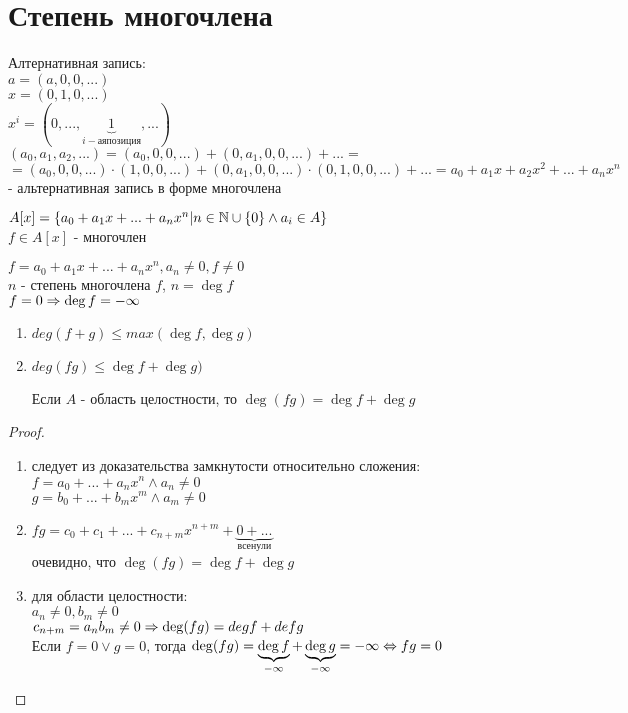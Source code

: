 \section{Степень многочлена}	
	Алтернативная запись:\\
		$ a = (a, 0, 0, ...)$\\		
		$ x = (0, 1, 0, ...)$\\		
		$ x^i = (0, ..., \underbrace{1}_{i-ая позиция}, ...)$\\
		$ (a_0, a_1, a_2, ...) = (a_0, 0, 0, ...) + (0, a_1, 0, 0, ...) + ... = $\\
		$= (a_0, 0, 0, ...) \cdot (1, 0, 0, ...) + (0, a_1, 0, 0, ...) \cdot (0, 1, 0, 0, ...) + ... = a_0 + a_1x + a_2x^2 + ... + a_nx^n$ - альтернативная запись в форме многочлена\\
	
\begin{Def}
	$ A[x] = \lbrace a_0 + a_1x + ... + a_nx^n | n \in \mathbb{N} \cup \lbrace 0 \rbrace \wedge a_i \in A \rbrace$\\
	$ f \in A[x]$ - многочлен
\end{Def}
	
\begin{Def}
	$ f = a_0 + a_1x + ... + a_nx^n, a_n \neq 0, f \neq 0$	\\
	$n$ - степень многочлена $f$, $n = \deg f$\\
	$f = 0 \Rightarrow \deg f = - \infty$
\end{Def}
	 
\begin{theorem}{}
	\begin{enumerate}
	\item $deg(f + g) \leq max(\deg f, \deg g)$
	\item $deg(fg)  \leq \deg f + \deg g)$
	\begin{Rem}
		Если $A$ - область целостности, то $\deg (fg) = \deg f + \deg g$
	\end{Rem}
	\end{enumerate}		
\end{theorem}			 

\begin{proof}
	\begin{enumerate}
	\item следует из доказательства замкнутости относительно сложения:\\
	$f = a_0 + ... + a_nx^n \wedge a_n \neq 0$\\
	$g = b_0 + ... + b_mx^m \wedge a_m \neq 0$
	\item $fg = c_0 + c_1 + ... + c_{n+m}x^{n+m} + \underbrace{0 + ... }_{все нули}$\\
	очевидно, что $\deg (fg) = \deg f + \deg g$\\
	\item для области целостности:\\
	$a_n \neq 0, b_m \neq 0$\\
	$c_{n+m} = a_nb_m \neq 0 \Rightarrow \deg (fg) = deg f + def g$\\
	Если $f = 0 \vee g = 0$, тогда $\deg (fg) = \underbrace{\deg f}_{-\infty} + \underbrace{\deg g}_{-\infty} = -\infty \Leftrightarrow fg = 0$
	\end{enumerate}
\end{proof}	 

